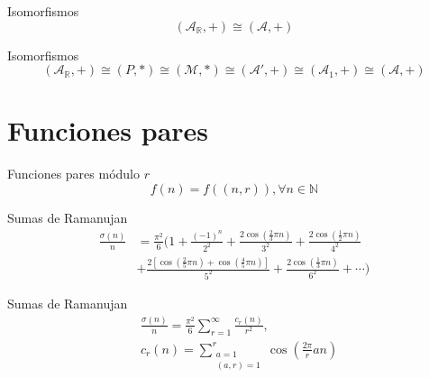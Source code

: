 \documentclass{beamer}
\begin{document}
\begin{frame}{Isomorfismos}
    \begin{equation*}
        (\mathcal{A}_{\mathbb{R}}, +) \cong (\mathcal{A}, +)
    \end{equation*}
\end{frame}

\begin{frame}{Isomorfismos}
    \begin{equation*}
        (\mathcal{A}_{\mathbb{R}}, +) \cong (P, *) \cong (\mathcal{M},*) \cong (\mathcal{A}', +) \cong (\mathcal{A}_1, +) \cong (\mathcal{A}, +)
    \end{equation*}
\end{frame}

\section{Funciones pares}

\begin{frame}{Funciones pares módulo $r$}
    \begin{equation*}
        f(n) = f((n,r)), \forall n \in \mathbb{N}
    \end{equation*}
\end{frame}

\begin{frame}{Sumas de Ramanujan}
    \begin{align*}
        \frac{\sigma(n)}{n} & = \frac{\pi^2}{6} \Bigg( 1 + \frac{(-1)^n}{2^2} + \frac{2 \cos \left( \frac{2}{3} \pi n \right)}{3^2} + \frac{2 \cos \left( \frac{1}{2} \pi n \right)}{4^2} \\
                            & + \frac{2 \left[ \cos \left( \frac{2}{5} \pi n \right) + \cos \left( \frac{4}{5} \pi n \right) \right]}{5^2} + \frac{2 \cos \left( \frac{1}{3} \pi n \right)}{6^2} + \cdots \Bigg)
    \end{align*}
\end{frame}

\begin{frame}{Sumas de Ramanujan}
    \begin{align*}
        & \frac{\sigma(n)}{n} = \frac{\pi^2}{6} \sum_{r=1}^{\infty} \frac{c_r(n)}{r^2}, \\
        & c_r(n) = \sum_{\substack{a=1 \\ (a,r) = 1}}^{r} \cos \left( \frac{2 \pi}{r} a n \right)
    \end{align*}
\end{frame}
\end{document}

